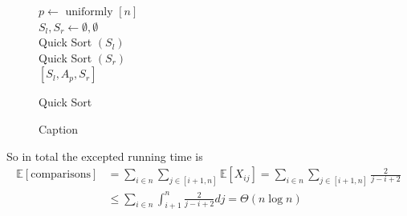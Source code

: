 \begin{figure}[h!]
    \centering
    \begin{algorithm}[H]
        \SetAlgoLined
        
        
         \(p \leftarrow \text{ uniformly } \left[n\right] \) \\
         \( S_{l} , S_{r} \leftarrow  \emptyset, \emptyset\)
         \ \\ 
        Quick Sort \( ( S_{l} ) \) \\
        Quick Sort \( ( S_{r} ) \)\\
        \Return \( [ S_{l}, A_{p}, S_{r} ]\)  
         \caption{Quick Sort}
    \end{algorithm}
    \caption{Caption}
    \label{fig:my_label2}
\end{figure}

So in total the excepted running time is 
\begin{equation*}
    \begin{split}
        \mathbb{E}\left[\text{comparisons}\right] &= \sum_{i\in n}{\sum_{j \in [i +1,n]}{\mathbb{E}[X_{ij}]}} = \sum_{i\in n}{\sum_{j \in [i +1,n]}{\frac{2}{j-i+2}}} \\ & \le \sum_{i\in n} \int_{i+1}^{n}{\frac{2}{j-i+2 }dj} = \Theta\left(n \log n\right)
    \end{split}
\end{equation*}




